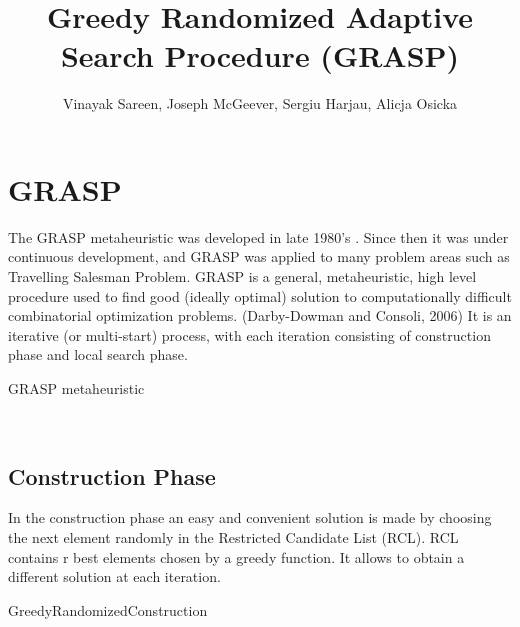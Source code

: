 \documentclass[12pt]{article}
\title {Greedy Randomized Adaptive Search Procedure (GRASP)}
\author{ {
		Vinayak Sareen, Joseph McGeever, Sergiu Harjau, Alicja Osicka	
	}
}
\date{}
\begin{document}
	\maketitle
	\section{GRASP}
The GRASP metaheuristic was developed in late 1980’s \citep*{FeoT.andResendeM.1989}. Since then it was under continuous development, and GRASP was applied to many problem areas such as Travelling Salesman Problem.
GRASP is a general, metaheuristic, high level procedure used to find good (ideally optimal) solution to computationally difficult combinatorial optimization problems. (Darby-Dowman and Consoli, 2006) It is an iterative (or multi-start) process, with each iteration consisting of construction phase and local search phase. 
\begin{algorithm}
\caption{ GRASP metaheuristic}
\\
\begin {algorithmic}
\EndFor
\State {}
\end{algorithmic}
\end{algorithm}


\subsection {Construction Phase}

In the construction phase an easy and convenient solution is made by choosing the next element randomly in the Restricted Candidate List (RCL). RCL contains r best elements chosen by a greedy function. It allows to obtain a different solution at each iteration. 
\begin{algorithm}
\caption{ GreedyRandomizedConstruction}
\\
\begin {algorithmic}
 
	\EndWhile
	\State {}

\end{algorithmic}
\end{algorithm}
\end{document}
